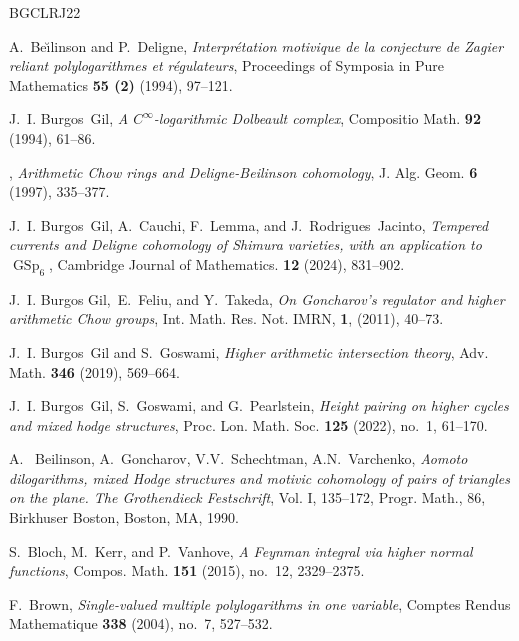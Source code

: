 \documentclass[11pt,a4paper]{amsart}
\numberwithin{equation}{section}
\theoremstyle{plain}
\theoremstyle{definition}
\begin{document}

\begin{thebibliography}{BGCLRJ22}

A.~Be{\u \i}linson and P.~Deligne, \emph{{I}nterpr\'etation motivique de la
  conjecture de {Z}agier reliant polylogarithmes et r\'egulateurs}, Proceedings
  of Symposia in Pure Mathematics \textbf{55 (2)} (1994), 97--121.

J.~I. Burgos~Gil, \emph{A ${C}^{\infty}$-logarithmic {D}olbeault complex},
  Compositio Math. \textbf{92} (1994), 61--86.

\bysame, \emph{Arithmetic {C}how rings and {D}eligne-{B}eilinson cohomology},
  J. Alg. Geom. \textbf{6} (1997), 335--377.

J.~I. Burgos~Gil, A.~Cauchi, F.~Lemma, and J.~Rodrigues~Jacinto,
  \emph{{T}empered currents and {D}eligne cohomology of {S}himura varieties,
  with an application to $\operatorname{GSp}_6$}, Cambridge Journal of Mathematics. \textbf{12} (2024), 831--902.
  
J.~I. Burgos Gil,~E.~Feliu, and Y.~Takeda, \emph{ {On {G}oncharov's regulator and higher arithmetic {C}how groups}}, Int. Math. Res. Not. IMRN, \textbf{1}, (2011), 40--73.
	
J.~I. Burgos~Gil and S.~Goswami, \emph{Higher arithmetic intersection theory},
  Adv. Math. \textbf{346} (2019), 569--664.

J.~I. Burgos~Gil, S.~Goswami, and G.~Pearlstein, \emph{Height pairing on higher
  cycles and mixed hodge structures}, Proc. Lon. Math. Soc. \textbf{125}
  (2022), no.~1, 61--170.
  

A.~ Beilinson, A.~Goncharov, V.V.~Schechtman, A.N.~Varchenko, \emph{Aomoto dilogarithms, mixed Hodge structures and motivic cohomology of pairs of triangles on
the plane. The Grothendieck Festschrift}, Vol. I, 135--172, Progr. Math., 86, Birkhuser Boston,
Boston, MA, 1990.

S.~Bloch, M.~Kerr, and P.~Vanhove, \emph{A {F}eynman integral via higher normal
  functions}, Compos. Math. \textbf{151} (2015), no.~12, 2329--2375.

F.~Brown, \emph{Single-valued multiple polylogarithms in one variable}, Comptes
  Rendus Mathematique \textbf{338} (2004), no.~7, 527--532.


\end{thebibliography}
\end{document}
